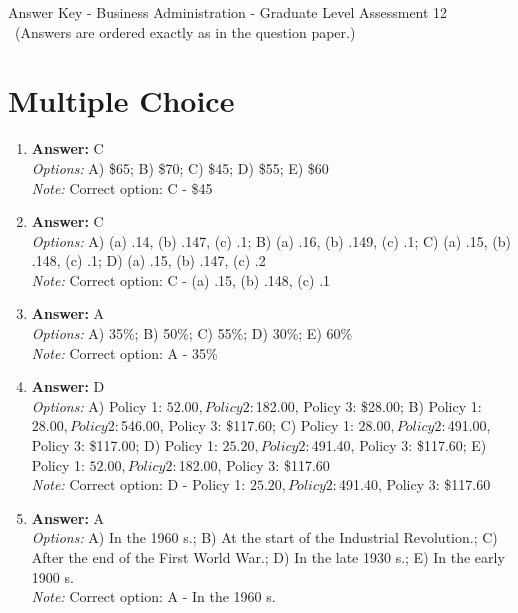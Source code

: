 \documentclass[12pt]{article}
\begin{document}
\begin{center}
Answer Key - Business Administration - Graduate Level Assessment 12 \
\small (Answers are ordered exactly as in the question paper.)
\end{center}

\section*{Multiple Choice}
\begin{enumerate}[label=\arabic*.]
\item \textbf{Answer:} C
\\ \textit{Options:} A) \$65; B) \$70; C) \$45; D) \$55; E) \$60
\\ \textit{Note:} Correct option: C - \$45
\item \textbf{Answer:} C
\\ \textit{Options:} A) (a) .14, (b) .147, (c) .1; B) (a) .16, (b) .149, (c) .1; C) (a) .15, (b) .148, (c) .1; D) (a) .15, (b) .147, (c) .2
\\ \textit{Note:} Correct option: C - (a) .15, (b) .148, (c) .1
\item \textbf{Answer:} A
\\ \textit{Options:} A) 35\%; B) 50\%; C) 55\%; D) 30\%; E) 60\%
\\ \textit{Note:} Correct option: A - 35\%
\item \textbf{Answer:} D
\\ \textit{Options:} A) Policy 1: $52.00, Policy 2: $182.00, Policy 3: \$28.00; B) Policy 1: $28.00, Policy 2: $546.00, Policy 3: \$117.60; C) Policy 1: $28.00, Policy 2: $491.00, Policy 3: \$117.00; D) Policy 1: $25.20, Policy 2: $491.40, Policy 3: \$117.60; E) Policy 1: $52.00, Policy 2: $182.00, Policy 3: \$117.60
\\ \textit{Note:} Correct option: D - Policy 1: $25.20, Policy 2: $491.40, Policy 3: \$117.60
\item \textbf{Answer:} A
\\ \textit{Options:} A) In the 1960 s.; B) At the start of the Industrial Revolution.; C) After the end of the First World War.; D) In the late 1930 s.; E) In the early 1900 s.
\\ \textit{Note:} Correct option: A - In the 1960 s.
\end{enumerate}
\end{document}
